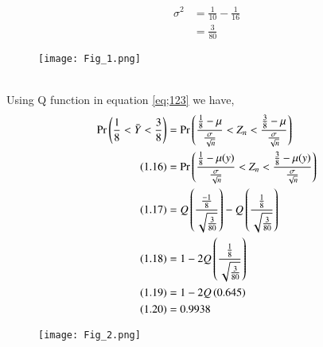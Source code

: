 \documentclass[journal,12pt,twocolumn]{IEEEtran}
\begin{document}
\begin{align}
\tag{1.14}
 \sigma^{2}&=\frac{1}{10}-\frac{1}{16}\\
\tag{1.15}
           &=\frac{3}{80}
\end{align}
\begin{figure}[ht]
    \centering
    \texttt{[image: Fig\_1.png]}
    \caption{}
    \label{Fig_1}
\end{figure}\\
Using Q function in equation \ref{eq;123} we have,
\begin{align}
\notag
\Pr\left(\frac{1}{8}<\Bar{Y}<\frac{3}{8}\right)
&=\Pr\left(\frac{\frac{1}{8}-\mu}{\frac{\sigma}{\sqrt{n}}}<Z_{n}<\frac{\frac{3}{8}-\mu}{\frac{\sigma}{\sqrt{n}}}\right)\\
\tag{1.16}
&=\Pr\left(\frac{\frac{1}{8}-\mu(y)}{\frac{\sigma}{\sqrt{n}}}<Z_{n}<\frac{\frac{3}{8}-\mu(y)}{\frac{\sigma}{\sqrt{n}}}\right)\\
\tag{1.17}
&=Q\left(\frac{\frac{-1}{8}}{\sqrt{\frac{3}{80}}}\right)-Q\left(\frac{\frac{1}{8}}{\sqrt{\frac{3}{80}}}\right)\\
\tag{1.18}
&=1-2Q\left(\frac{\frac{1}{8}}{\sqrt{\frac{3}{80}}}\right)\\
\tag{1.19}                             
&=1-2Q\left(0.645\right)\\
\tag{1.20}                             
&=0.9938
\end{align}
\begin{figure}[ht]
    \centering
    \texttt{[image: Fig\_2.png]}
    \caption{}
    \label{Fig_2}
\end{figure}
\end{document}
